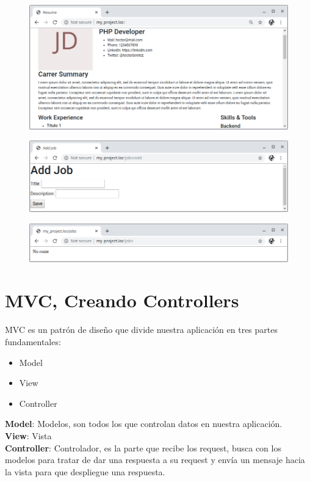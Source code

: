 \documentclass{article}
\begin{document}
\begin{figure}[h!]
  \centering
  \includegraphics[scale=0.5]{./Pictures/123_route_funcional.png}
\end{figure}

\begin{figure}[h!]
  \centering
  \includegraphics[scale=0.5]{./Pictures/124_route_funcional.png}
\end{figure}

\begin{figure}[h!]
  \centering
  \includegraphics[scale=0.5]{./Pictures/125_route_funcional.png}
\end{figure}

\newpage

\section{MVC, Creando Controllers}%
MVC es un patrón de diseño que divide nuestra aplicación en tres partes
fundamentales:
\begin{itemize}
  \item Model
  \item View
  \item Controller
\end{itemize}
\textbf{Model}: Modelos, son todos los que controlan datos en nuestra aplicación.\\
\textbf{View}: Vista\\
\textbf{Controller}: Controlador, es la parte que recibe los request, busca con
los modelos para tratar de dar una respuesta a su request y envía un mensaje
hacia la vista para que despliegue una respuesta.\\
\end{document}
